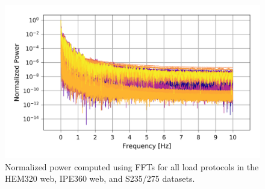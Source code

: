 \documentclass[a4paper,11pt]{article}
\begin{document}
\begin{figure}
    \centering
    \includegraphics{frequency_power.png}
    \caption{Normalized power computed using FFTs for all load protocols in the HEM320 web, IPE360 web, and S235/275 datasets.}
    \label{fig:frequency-power}
\end{figure}
\end{document}
